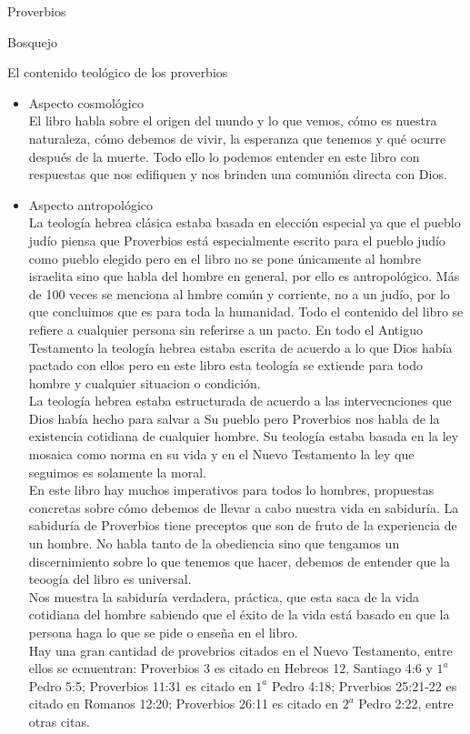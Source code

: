 \begin{section}{Proverbios}
\begin{subsection}{Bosquejo}
\begin{subsubsection}{El contenido teológico de los proverbios}
				\begin{itemize}
					\item Aspecto cosmológico\\
						El libro habla sobre el origen del mundo y lo que vemos, cómo es nuestra naturaleza, cómo debemos de vivir, la esperanza que tenemos y qué ocurre después de la muerte. Todo ello  lo podemos entender en este libro con respuestas que nos edifiquen y nos brinden una comunión directa con Dios.
					\item Aspecto antropológico\\
						La teología hebrea clásica estaba basada en elección especial ya que el pueblo judío piensa que Proverbios está especialmente escrito para el pueblo judío como pueblo elegido pero en el libro no se pone únicamente al hombre israelita sino que habla del hombre en general, por ello es antropológico. Más de 100 veces se menciona al hmbre común y corriente, no a un judío, por lo que concluimos que es para toda la humanidad. Todo el contenido del libro se refiere a cualquier persona sin referirse a un pacto. En todo el Antiguo Testamento la teología hebrea estaba escrita de acuerdo a lo que Dios había pactado con ellos pero en este libro esta teología se extiende para todo hombre y cualquier situacion o condición.\\
						La teología hebrea estaba estructurada de acuerdo a las intervecnciones que Dios había hecho para salvar a Su pueblo pero Proverbios nos habla de la existencia cotidiana de cualquier hombre. Su teología estaba basada en la ley mosaica como norma en su vida y en el Nuevo Testamento la ley que seguimos es solamente la moral.\\ 
						En este libro hay muchos imperativos para todos lo hombres, propuestas concretas sobre cómo debemos de llevar a cabo nuestra vida en sabiduría. La sabiduría de Proverbios tiene preceptos que son de fruto de la experiencia de un hombre. No habla tanto de la obediencia sino que tengamos un discernimiento sobre lo que tenemos que hacer, debemos de entender que la teoogía del libro es universal.\\
						Nos muestra la sabiduría verdadera, práctica, que esta saca de la vida cotidiana del hombre sabiendo que el éxito de la vida está basado en que la persona haga lo que se pide o enseña en el libro.\\
						Hay una gran cantidad de provebrios citados en el Nuevo Testamento, entre ellos se ecnuentran: Proverbios 3 es citado en Hebreos 12, Santiago 4:6 y $1^{a}$ Pedro 5:5; Proverbios 11:31 es citado en $1^{a}$ Pedro 4:18; Prverbios 25:21-22 es citado en Romanos 12:20; Proverbios 26:11 es citado en $2^{a}$ Pedro 2:22, entre otras citas.

\end{itemize}
\end{subsubsection}
\end{subsection}
\end{section}
